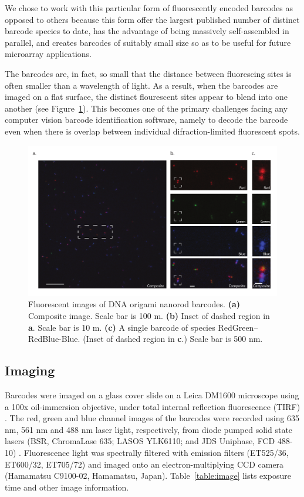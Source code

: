We chose to work with this particular form of fluorescently encoded barcodes as opposed to others because this form offer the largest published number of distinct barcode species to date, has the advantage of being massively self-assembled in parallel, and creates barcodes of suitably small  size so as to be useful for future microarray applications. 

The barcodes are, in fact, so small that the distance between fluorescing sites is often smaller than a wavelength of light. As a result, when the barcodes are imaged on a flat surface, the distinct flourescent sites appear to blend into one another (see Figure~\ref{fig:rawImage}). This becomes one of the primary challenges facing any computer vision barcode identification software, namely to  decode the barcode even when there is overlap between individual difraction-limited fluorescent spots. 
\begin{figure}[htbp]
\begin{center}
	\includegraphics[width=\textwidth]{figures/theoryRawImage}
	\caption{Fluorescent images of DNA origami nanorod barcodes. \textbf{(a)} Composite image. Scale bar is 100 \textmu m. \textbf{(b)} Inset of dashed region in \textbf{a}. Scale bar is 10 \textmu m. \textbf{(c)} A single barcode of species RedGreen--RedBlue-Blue. (Inset of dashed region in \textbf{c}.) Scale bar is 500 nm. \label{fig:rawImage}}
\end{center}	
\end{figure}


\subsection{Imaging}
Barcodes were imaged on a glass cover slide on a Leica DM1600 microscope using a 100x oil-immersion objective,  under total internal reflection fluorescence (TIRF) . 
The red, green and blue channel images of the barcodes were  recorded using  635 nm, 561 nm and 488 nm laser light, respectively, from diode pumped solid state lasers (BSR, ChromaLase 635; LASOS YLK6110; and JDS Uniphase, FCD 488-10) . Fluorescence light was spectrally filtered with emission filters (ET525/36, ET600/32, ET705/72) and imaged onto an electron-multiplying CCD camera (Hamamatsu C9100-02, Hamamatsu, Japan). Table~\ref{table:image} lists exposure time and other image information.

